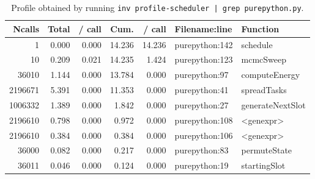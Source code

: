 \begin{table}[H]
  \centering
  \caption{Profile obtained by running \texttt{inv profile-scheduler | grep purepython.py}.}
  \begin{tabular}{rrrrrll}
    \hline
    \bf Ncalls & \bf Total & \bf / call & \bf Cum. & \bf / call & \bf Filename:line & \bf Function     \\
    \hline
    1          & 0.000     & 0.000      & 14.236   & 14.236     & purepython:142    & schedule         \\
    10         & 0.209     & 0.021      & 14.235   & 1.424      & purepython:123    & mcmcSweep        \\
    36010      & 1.144     & 0.000      & 13.784   & 0.000      & purepython:97     & computeEnergy    \\
    2196671    & 5.391     & 0.000      & 11.353   & 0.000      & purepython:41     & spreadTasks      \\
    1006332    & 1.389     & 0.000      & 1.842    & 0.000      & purepython:27     & generateNextSlot \\
    2196610    & 0.798     & 0.000      & 0.972    & 0.000      & purepython:108    & <genexpr>        \\
    2196610    & 0.384     & 0.000      & 0.384    & 0.000      & purepython:106    & <genexpr>        \\
    36000      & 0.082     & 0.000      & 0.217    & 0.000      & purepython:83     & permuteState     \\
    36011      & 0.046     & 0.000      & 0.124    & 0.000      & purepython:19     & startingSlot     \\
  \end{tabular}
  \label{table:profile}
\end{table}
